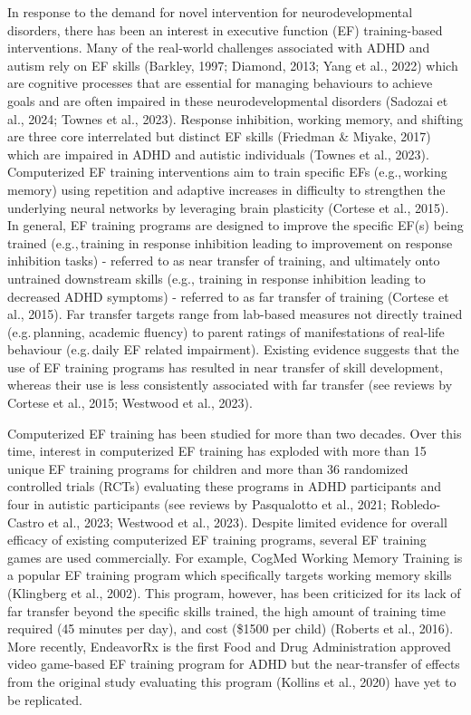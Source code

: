 \documentclass[
  letterpaper,
]{ut-thesis}
\begin{document}
In response to the demand for novel intervention for neurodevelopmental
disorders, there has been an interest in executive function (EF)
training-based interventions. Many of the real-world challenges
associated with ADHD and autism rely on EF skills (Barkley, 1997;
Diamond, 2013; Yang et al., 2022) which are cognitive processes that are
essential for managing behaviours to achieve goals and are often
impaired in these neurodevelopmental disorders (Sadozai et al., 2024;
Townes et al., 2023). Response inhibition, working memory, and shifting
are three core interrelated but distinct EF skills (Friedman \& Miyake,
2017) which are impaired in ADHD and autistic individuals (Townes et
al., 2023). Computerized EF training interventions aim to train specific
EFs (e.g.,\,working memory) using repetition and adaptive increases in
difficulty to strengthen the underlying neural networks by leveraging
brain plasticity (Cortese et al., 2015). In general, EF training
programs are designed to improve the specific EF(s) being trained
(e.g.,\,training in response inhibition leading to improvement on
response inhibition tasks) - referred to as near transfer of training,
and ultimately onto untrained downstream skills (e.g., training in
response inhibition leading to decreased ADHD symptoms) - referred to as
far transfer of training (Cortese et al., 2015). Far transfer targets
range from lab-based measures not directly trained (e.g.\,planning,
academic fluency) to parent ratings of manifestations of real-life
behaviour (e.g.\,daily EF related impairment). Existing evidence
suggests that the use of EF training programs has resulted in near
transfer of skill development, whereas their use is less consistently
associated with far transfer (see reviews by Cortese et al., 2015;
Westwood et al., 2023).

Computerized EF training has been studied for more than two decades.
Over this time, interest in computerized EF training has exploded with
more than 15 unique EF training programs for children and more than 36
randomized controlled trials (RCTs) evaluating these programs in ADHD
participants and four in autistic participants (see reviews by
Pasqualotto et al., 2021; Robledo-Castro et al., 2023; Westwood et al.,
2023). Despite limited evidence for overall efficacy of existing
computerized EF training programs, several EF training games are used
commercially. For example, CogMed Working Memory Training is a popular
EF training program which specifically targets working memory skills
(Klingberg et al., 2002). This program, however, has been criticized for
its lack of far transfer beyond the specific skills trained, the high
amount of training time required (45 minutes per day), and cost (\$1500
per child) (Roberts et al., 2016). More recently, EndeavorRx is the
first Food and Drug Administration approved video game-based EF training
program for ADHD but the near-transfer of effects from the original
study evaluating this program (Kollins et al., 2020) have yet to be
replicated.
\end{document}
